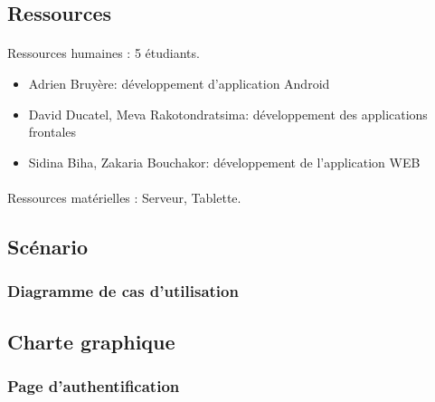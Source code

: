 \documentclass[a4paper,12pt]{article}
\begin{document}
\subsection{Ressources}
\paragraph*{}
Ressources humaines : 5 étudiants.
\begin{itemize}
 \item Adrien Bruyère: développement d'application Android
 \item David Ducatel, Meva Rakotondratsima: développement des applications frontales
 \item Sidina Biha, Zakaria Bouchakor: développement de l'application WEB
\end{itemize}

\paragraph*{}
Ressources matérielles : Serveur, Tablette.

\subsection{Scénario}
\subsubsection{Diagramme de cas d'utilisation}
\paragraph{}

\newpage
\subsection{Charte graphique}
\subsubsection{Page d'authentification}
\end{document}

